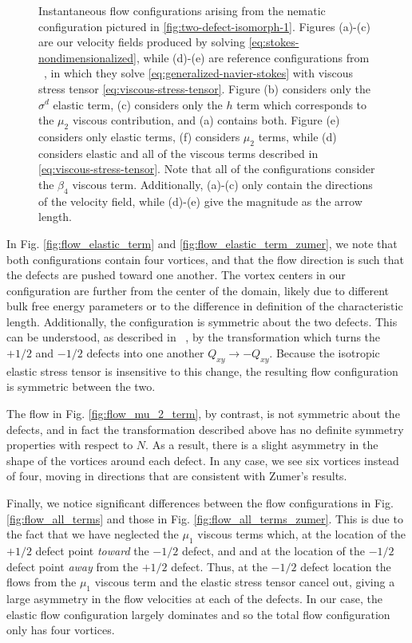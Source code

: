 \documentclass[reqno]{article}
\begin{document}
\begin{figure}[h]
    \caption{Instantaneous flow configurations arising from the nematic
      configuration pictured in \ref{fig:two-defect-isomorph-1}.
      Figures (a)-(c)
      are our velocity fields produced by solving
      \eqref{eq:stokes-nondimensionalized}, while (d)-(e) are reference
      configurations from ~\cite{svensek_complex_2002}, in which they solve
      \eqref{eq:generalized-navier-stokes} with viscous stress tensor
      \eqref{eq:viscous-stress-tensor}.
      Figure (b) considers only the $\sigma^d$ elastic term, (c) considers only
      the $h$ term which corresponds to the $\mu_2$ viscous contribution, and (a) contains both.
      Figure (e) considers only elastic terms, (f) considers $\mu_2$ terms,
      while (d) considers elastic and all of the viscous terms described in
      \eqref{eq:viscous-stress-tensor}.
      Note that all of the configurations consider the $\beta_4$ viscous term.
      Additionally, (a)-(c) only contain the directions of the velocity field,
      while (d)-(e) give the magnitude as the arrow length.}
    \label{fig:flow-configurations}
  \end{figure}

  In Fig. \ref{fig:flow_elastic_term} and
  \ref{fig:flow_elastic_term_zumer}, we note that both
  configurations contain four vortices, and that the flow direction is such that
  the defects are pushed toward one another.
  The vortex centers in our configuration are further from the center of the
  domain, likely due to different bulk free energy parameters or to the
  difference in definition of the characteristic length.
  Additionally, the configuration is symmetric about the two defects.
  This can be understood, as described in ~\cite{svensek_complex_2002}, by the transformation
  which turns the $+1/2$ and $-1/2$ defects into one another $Q_{xy} \to
  -Q_{xy}$.
  Because the isotropic elastic stress tensor is insensitive to this change, the
  resulting flow configuration is symmetric between the two.

  The flow in Fig. \ref{fig:flow_mu_2_term}, by contrast, is not symmetric about the
  defects, and in fact the transformation described above has no definite
  symmetry properties with respect to $N$.
  As a result, there is a slight asymmetry in the shape of the vortices around
  each defect.
  In any case, we see six vortices instead of four, moving in directions that
  are consistent with Zumer's results.

  Finally, we notice significant differences between the flow configurations in
  Fig. \ref{fig:flow_all_terms} and those in Fig. \ref{fig:flow_all_terms_zumer}.
  This is due to the fact that we have neglected the $\mu_1$ viscous terms
  which, at the location of the $+1/2$ defect point \textit{toward} the $-1/2$ defect,
  and and at the location of the $-1/2$ defect point \textit{away} from the
  $+1/2$ defect.
  Thus, at the $-1/2$ defect location the flows from the $\mu_1$ viscous term
  and the elastic stress tensor cancel out, giving a large asymmetry in the flow
  velocities at each of the defects.
  In our case, the elastic flow configuration largely dominates and so the total
  flow configuration only has four vortices.
\end{document}
